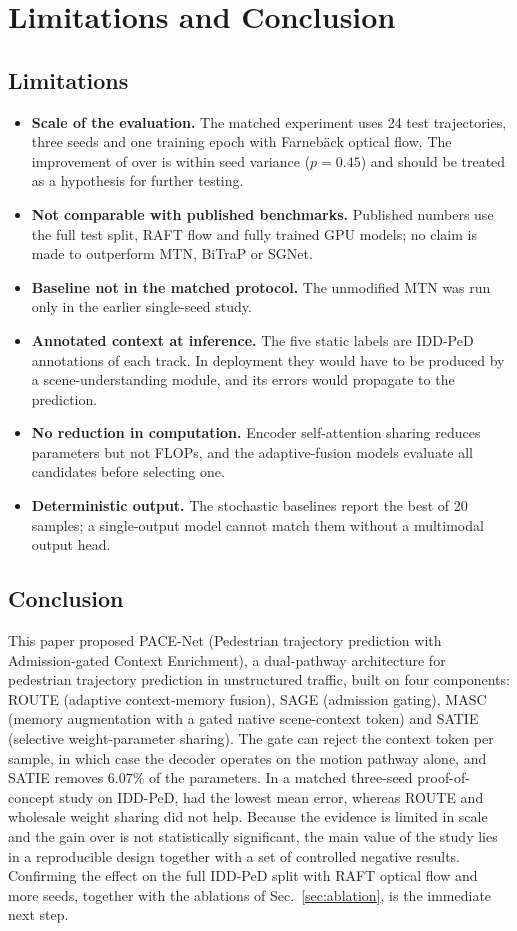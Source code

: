\section{Limitations and Conclusion}\label{sec:limits}
\subsection{Limitations}
\begin{itemize}[leftmargin=1.4em,itemsep=1pt,topsep=2pt]
\item \textbf{Scale of the evaluation.} The matched experiment uses 24 test trajectories, three seeds and one training epoch with Farneb\"ack optical flow. The improvement of \CAMTNS over \CAMTN is within seed variance ($p=0.45$) and should be treated as a hypothesis for further testing.
\item \textbf{Not comparable with published benchmarks.} Published numbers use the full test split, RAFT flow and fully trained GPU models; no claim is made to outperform MTN, BiTraP or SGNet.
\item \textbf{Baseline not in the matched protocol.} The unmodified MTN was run only in the earlier single-seed study.
\item \textbf{Annotated context at inference.} The five static labels are IDD-PeD annotations of each track. In deployment they would have to be produced by a scene-understanding module, and its errors would propagate to the prediction.
\item \textbf{No reduction in computation.} Encoder self-attention sharing reduces parameters but not FLOPs, and the adaptive-fusion models evaluate all candidates before selecting one.
\item \textbf{Deterministic output.} The stochastic baselines report the best of 20 samples; a single-output model cannot match them without a multimodal output head.
\end{itemize}

\subsection{Conclusion}
This paper proposed PACE-Net (Pedestrian trajectory prediction with Admission-gated Context Enrichment), a dual-pathway architecture for pedestrian trajectory prediction in unstructured traffic, built on four components: ROUTE (adaptive context-memory fusion), SAGE (admission gating), MASC (memory augmentation with a gated native scene-context token) and SATIE (selective weight-parameter sharing). The gate can reject the context token per sample, in which case the decoder operates on the motion pathway alone, and SATIE removes $6.07\%$ of the parameters. In a matched three-seed proof-of-concept study on IDD-PeD, \CAMTNS had the lowest mean error, whereas ROUTE and wholesale weight sharing did not help. Because the evidence is limited in scale and the gain over \CAMTN is not statistically significant, the main value of the study lies in a reproducible design together with a set of controlled negative results. Confirming the effect on the full IDD-PeD split with RAFT optical flow and more seeds, together with the ablations of Sec.~\ref{sec:ablation}, is the immediate next step.
